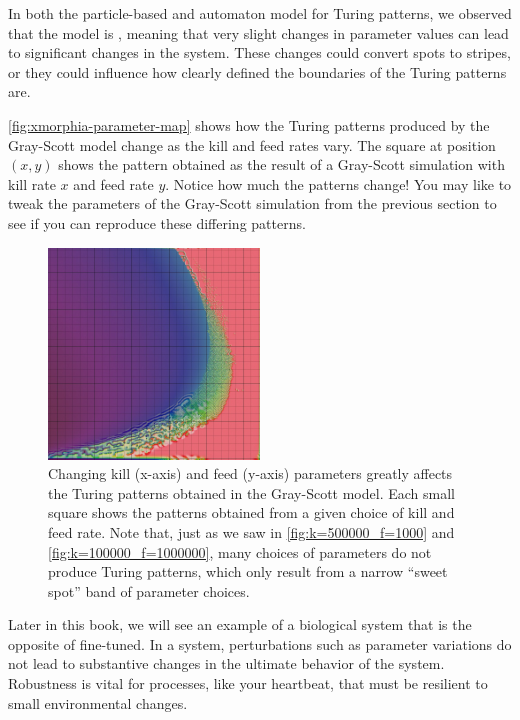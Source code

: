 In both the particle-based and automaton model for Turing patterns, we observed that the model is , meaning that very slight changes in parameter values can lead to significant changes in the system. These changes could convert spots to stripes, or they could influence how clearly defined the boundaries of the Turing patterns are.

\autoref{fig:xmorphia-parameter-map} shows how the Turing patterns produced by the Gray-Scott model change as the kill and feed rates vary. The square at position $(x, y)$ shows the pattern obtained as the result of a Gray-Scott simulation with kill rate $x$ and feed rate $y$. Notice how much the patterns change! You may like to tweak the parameters of the Gray-Scott simulation from the previous section to see if you can reproduce these differing patterns.\\

\begin{figure}[h]
\centering
\mySfFamily
\includegraphics[width = 0.5\textwidth]{../images/xmorphia-parameter-map.jpg}
\caption{Changing kill (x-axis) and feed (y-axis) parameters greatly affects the Turing patterns obtained in the Gray-Scott model. Each small square shows the patterns obtained from a given choice of kill and feed rate.  Note that, just as we saw in \autoref{fig:k=500000_f=1000} and \autoref{fig:k=100000_f=1000000}, many choices of parameters do not produce Turing patterns, which only result from a narrow ``sweet spot'' band of parameter choices.}
\label{fig:xmorphia-parameter-map}
\end{figure}

Later in this book, we will see an example of a biological system that is the opposite of fine-tuned. In a  system, perturbations such as parameter variations do not lead to substantive changes in the ultimate behavior of the system. Robustness is vital for processes, like your heartbeat, that must be resilient to small environmental changes.

